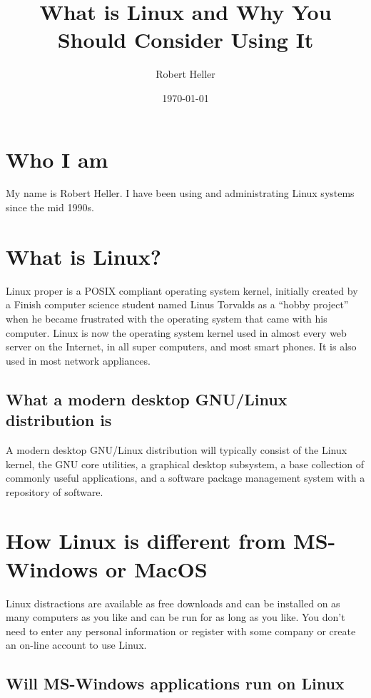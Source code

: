 \documentclass[letterpaper,twoside,12pt]{article}
\title{What is Linux and Why You Should Consider Using It}
\author{Robert Heller}
\date{\today}
\begin{document}
\maketitle

\tableofcontents

\section{Who I am}

My name is Robert Heller.  I have been using and administrating Linux 
systems since the mid 1990s. 

\section{What is Linux?}

Linux proper is a POSIX compliant operating system kernel, initially
created by a Finish computer science student named Linus Torvalds as a
``hobby project'' when he became frustrated with the operating system
that came with his computer. Linux is now the operating system kernel 
used in almost every web server on the Internet, in all super computers, 
and most smart phones.  It is also used in most network appliances.

\subsection{What a modern desktop GNU/Linux distribution is}

A modern desktop GNU/Linux distribution will typically consist of the 
Linux kernel, the GNU core utilities, a graphical desktop subsystem, a 
base collection of commonly useful applications, and a software package 
management system with a repository of software.  

\section{How Linux is different from MS-Windows or MacOS}

Linux distractions are available as free downloads and can be installed 
on as many computers as you like and can be run for as long as you like. 
You don't need to enter any personal information or register with some 
company or create an on-line account to use Linux.

\subsection{Will MS-Windows applications run on Linux}
\end{document}
